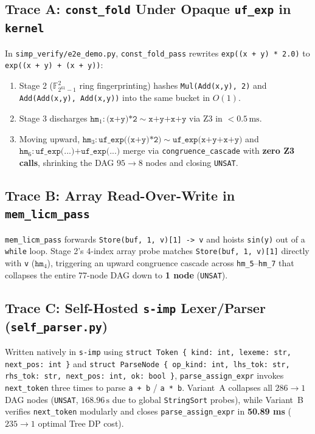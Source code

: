\documentclass[11pt,a4paper]{article}
\begin{document}
\subsection{Trace A: \texttt{const\_fold} Under Opaque \texttt{uf\_exp} in \texttt{kernel}}
In \texttt{simp\_verify/e2e\_demo.py}, \texttt{const\_fold\_pass} rewrites \texttt{exp((x + y) * 2.0)} to \texttt{exp((x + y) + (x + y))}:
\begin{enumerate}
  \item Stage 2 ($\mathbb{F}_{2^{61}-1}^2$ ring fingerprinting) hashes \texttt{Mul(Add(x,y), 2)} and \texttt{Add(Add(x,y), Add(x,y))} into the same bucket in $O(1)$.
  \item Stage 3 discharges $\texttt{hm}_1 : \texttt{(x+y)*2} \sim \texttt{x+y+x+y}$ via Z3 in $< 0.5\,\text{ms}$.
  \item Moving upward, $\texttt{hm}_3 : \texttt{uf\_exp((x+y)*2)} \sim \texttt{uf\_exp(x+y+x+y)}$ and $\texttt{hm}_6 : \texttt{uf\_exp(...)+uf\_exp(...)}$ merge via \texttt{congruence\_cascade} with \textbf{zero Z3 calls}, shrinking the DAG $95 \to 8$ nodes and closing \texttt{UNSAT}.
\end{enumerate}

\subsection{Trace B: Array Read-Over-Write in \texttt{mem\_licm\_pass}}
\texttt{mem\_licm\_pass} forwards \texttt{Store(buf, 1, v)[1] -> v} and hoists \texttt{sin(y)} out of a \texttt{while} loop. Stage 2's 4-index array probe matches \texttt{Store(buf, 1, v)[1]} directly with \texttt{v} ($\texttt{hm}_4$), triggering an upward congruence cascade across \texttt{hm\_5}--\texttt{hm\_7} that collapses the entire 77-node DAG down to \textbf{1 node} (\texttt{UNSAT}).

\subsection{Trace C: Self-Hosted \texttt{s-imp} Lexer/Parser (\texttt{self\_parser.py})}
Written natively in \texttt{s-imp} using \texttt{struct Token \{ kind: int, lexeme: str, next\_pos: int \}} and \texttt{struct ParseNode \{ op\_kind: int, lhs\_tok: str, rhs\_tok: str, next\_pos: int, ok: bool \}}, \texttt{parse\_assign\_expr} invokes \texttt{next\_token} three times to parse \texttt{a + b} / \texttt{a * b}. Variant~A collapses all $286 \to 1$ DAG nodes (\texttt{UNSAT}, $168.96\,\text{s}$ due to global \texttt{StringSort} probes), while Variant~B verifies \texttt{next\_token} modularly and closes \texttt{parse\_assign\_expr} in \textbf{50.89 ms} ($235 \to 1$ optimal Tree DP cost).
\end{document}
